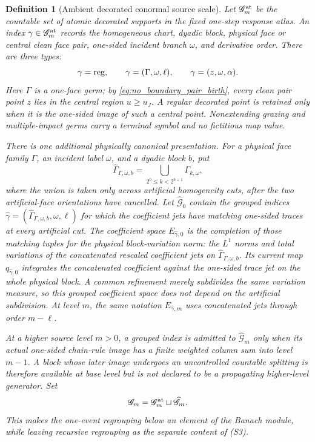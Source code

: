 \documentclass[11pt]{amsart}
\theoremstyle{compactplain}
\theoremstyle{compactdefinition}
\newtheorem{definition}[theorem]{Definition}
\theoremstyle{compactremark}
\begin{document}
\begin{definition}[Ambient decorated conormal source scale]
\label{def:ambient_conormal_source_scale}
Let \(\mathscr G_m^{\rm at}\) be the countable set of \emph{atomic}
decorated supports in the fixed one-step response atlas.  An index
\(\gamma\in\mathscr G_m^{\rm at}\) records the
homogeneous chart, dyadic block, physical face or central clean face pair,
one-sided incident branch \(\omega\), and derivative order.  There are three
types:
\[
 \gamma={\rm reg},\qquad
 \gamma=(\Gamma,\omega,\ell),\qquad
 \gamma=(z,\omega,\alpha).
\]
Here \(\Gamma\) is a one-face germ; by
\eqref{eq:no_boundary_pair_birth}, every clean pair point \(z\) lies in the
central region \(u\ge u_J\).  A regular decorated point is retained only when
it is the one-sided image of such a central point.  Nonextending grazing and
multiple-impact germs carry a terminal symbol and no fictitious map value.

There is one additional physically canonical presentation.  For a physical
face family \(\Gamma\), an incident label \(\omega\), and a dyadic block
\(b\), put
\[
 \widehat\Gamma_{\Gamma,\omega,b}
 =\bigcup_{2^b\le k<2^{b+1}}\Gamma_{k,\omega},
\]
where the union is taken only across artificial homogeneity cuts, after the
two artificial-face orientations have cancelled.  Let
\(\widehat{\mathscr G}_0\) contain the grouped indices
\(\widehat\gamma=(\widehat\Gamma_{\Gamma,\omega,b},\omega,\ell)\) for which
the coefficient jets have matching one-sided traces at every artificial cut.
The coefficient space \(E_{\widehat\gamma,0}\) is the completion of those
matching tuples for the physical block-variation norm: the \(L^1\) norms and
total variations of the concatenated rescaled coefficient jets on
\(\widehat\Gamma_{\Gamma,\omega,b}\).  Its current map
\(q_{\widehat\gamma,0}\) integrates the concatenated coefficient against the
one-sided trace jet on the whole physical block.  A common refinement merely
subdivides the same variation measure, so this grouped coefficient space does
not depend on the artificial subdivision.  At level \(m\), the same notation
\(E_{\widehat\gamma,m}\) uses concatenated jets through order \(m-\ell\).

At a higher source level \(m>0\), a grouped index is admitted to
\(\widehat{\mathscr G}_m\) only when its actual one-sided chain-rule image has
a finite weighted column sum into level \(m-1\).  A block whose later image
undergoes an uncontrolled countable splitting is therefore available at base
level but is not declared to be a propagating higher-level generator.  Set
\[
 \mathscr G_m=\mathscr G_m^{\rm at}\sqcup
 \widehat{\mathscr G}_m.
\]
This makes the one-event regrouping below an element of the Banach module,
while leaving recursive regrouping as the separate content of (S3).


\end{definition}
\end{document}
